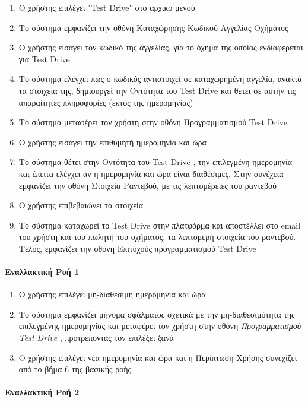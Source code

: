 \documentclass{../ol-softwaremanual}
\begin{document}
	\begin{enumerate}
		\item Ο χρήστης επιλέγει \en"Test Drive" \gr στο αρχικό μενού
		\item Το σύστημα εμφανίζει την οθόνη Καταχώρησης Κωδικού Αγγελίας Οχήματος
		\item Ο χρήστης εισάγει τον κωδικό της αγγελίας, για το όχημα της οποίας ενδιαφέρεται για \en Test Drive \gr
		\item Το σύστημα ελέγχει πως ο κωδικός αντιστοιχεί σε καταχωρημένη αγγελία, ανακτά τα στοιχεία της,  
		δημιουργεί την Οντότητα του \en Test Drive \gr και θέτει σε αυτήν τις απαραίτητες πληροφορίες (εκτός της ημερομηνίας)
		\item Το σύστημα μεταφέρει τον χρήστη στην οθόνη Προγραμματισμού \en Test Drive \gr 
		\item Ο χρήστης εισάγει την επιθυμητή ημερομηνία και ώρα		
		\item Το σύστημα θέτει στην Οντότητα του \en Test Drive \gr, την επιλεγμένη ημερομηνία και έπειτα ελέγχει αν η ημερομηνία και ώρα είναι διαθέσιμες. Στην συνέχεια εμφανίζει την οθόνη Στοιχεία Ραντεβού, με τις λεπτομέρειες του ραντεβού
		\item Ο χρήστης επιβεβαιώνει τα στοιχεία
		\item Το σύστημα καταχωρεί το \en Test Drive \gr στην πλατφόρμα και αποστέλλει στο \en email \gr του χρήστη και του πωλητή του οχήματος, τα λεπτομερή στοιχεία του ραντεβού. Τέλος, εμφανίζει την οθόνη Επιτυχούς προγραμματισμού \en Test Drive \gr 
	\end{enumerate}
	
	\paragraph{Εναλλακτική Ροή 1}
	
	\begin{enumerate}
		\item Ο χρήστης επιλέγει μη-διαθέσιμη ημερομηνία και ώρα
		\item Το σύστημα εμφανίζει μήνυμα σφάλματος σχετικά με την μη-διαθεσιμότητα της επιλεγμένης ημερομηνίας και μεταφέρει τον χρήστη στην οθόνη \textit{Προγραμματισμού \en Test Drive \gr}, προτρέποντάς τον επιλέξει ξανά
		\item Ο χρήστης επιλέγει νέα ημερομηνία και ώρα και η Περίπτωση Χρήσης συνεχίζει από το βήμα 6 της βασικής ροής
	\end{enumerate}
	
	
	\paragraph{Εναλλακτική Ροή 2}
	
\end{document}

